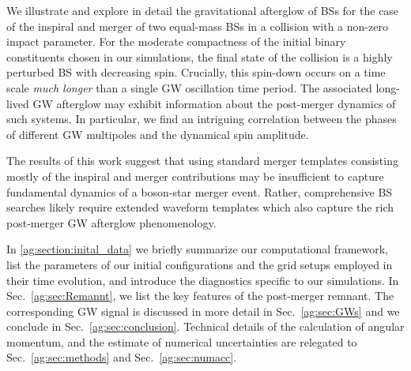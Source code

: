 We illustrate and explore in detail the gravitational afterglow
of BSs for the case of the inspiral and merger 
of two equal-mass BSs in a collision with a non-zero impact parameter. For the moderate compactness of the initial binary constituents chosen in our simulations, the final state of the collision
is a highly perturbed BS with decreasing spin. Crucially, this spin-down occurs on a time scale {\it much longer} than a single GW oscillation time period.  The associated long-lived GW afterglow may exhibit information about the post-merger dynamics of such systems. In particular, we find an intriguing correlation between the phases of different GW multipoles and the dynamical spin amplitude. 



The results of this work suggest that using standard merger templates consisting mostly of the inspiral and merger contributions may be insufficient to capture fundamental dynamics of a boson-star merger event. Rather, comprehensive BS searches likely require extended waveform templates which also capture the rich post-merger GW afterglow phenomenology.

In \ref{ag:section:inital_data} we 
briefly summarize our computational framework, list the parameters
of our initial configurations and the grid setups employed in their
time evolution, and introduce the diagnostics specific
to our simulations. In Sec.~\ref{ag:sec:Remannt},
we list the key features of the post-merger
remnant. The corresponding GW signal is discussed in more detail
in Sec.~\ref{ag:sec:GWs} and we conclude in Sec.~\ref{ag:sec:conclusion}.
Technical details of the calculation
of angular momentum, and the estimate of numerical uncertainties
are relegated to
Sec.~\ref{ag:sec:methods} and Sec.~\ref{ag:sec:numacc}.

